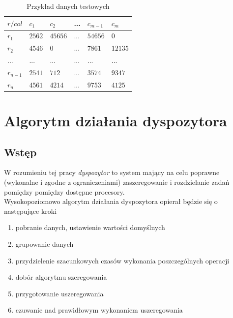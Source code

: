\documentclass[brudnopis]{xmgr}
\begin{document}
\begin{table}[!tbh]
\begin{tabular}{|l|l|l|l|l|l|} \hline
$r / col$   & $c_1$     & $c_2$     & ...   & $c_{m-1}$ & $c_{m}$   \\ \hline
$r_1$       & $2562$    & $45656$   & ...   & $54656$   & $0$       \\ \hline
$r_2$       & $4546$    & $0$       & ...   & $7861$    & $12135$   \\ \hline
$...$       & $...$     & $...$     & $...$ & $...$     & $...$     \\ \hline
$r_{n-1}$   & $2541$   & $712$      & ...   & $3574$    & $9347$    \\ \hline
$r_{n}$     & $4561$   & $4214$     & ...   & $9753$    & $4125$    \\ \hline
\end{tabular}
\caption{Przykład danych testowych\label{tab:example-sched-out}}
\end{table}

\chapter{Algorytm działania dyspozytora}

\section{Wstęp}

W rozumieniu tej pracy \emph{dyspozytor} to system mający na celu poprawne (wykonalne i zgodne z ograniczeniami) zaszeregowanie i rozdzielanie zadań pomiędzy pomiędzy dostępne procesory.
\medskip\\

Wysokopoziomowo algorytm działania dyspozytora opierał będzie się o następujące kroki

\begin{enumerate}
    \item pobranie danych, ustawienie wartości domyślnych
    \item grupowanie danych
    \item przydzielenie szacunkowych czasów wykonania poszczególnych operacji
    \item dobór algorytmu szeregowania 
    \item przygotowanie uszeregowania
    \item czuwanie nad prawidłowym wykonaniem uszeregowania
\end{enumerate}
\end{document}
